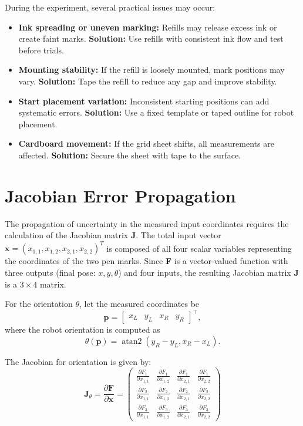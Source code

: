 During the experiment, several practical issues may occur:

\begin{itemize}
    \item \textbf{Ink spreading or uneven marking:} Refills may release excess ink or create faint marks.  
    \textbf{Solution:} Use refills with consistent ink flow and test before trials.

    \item \textbf{Mounting stability:} If the refill is loosely mounted, mark positions may vary.  
    \textbf{Solution:} Tape the refill to reduce any gap and improve stability.

    \item \textbf{Start placement variation:} Inconsistent starting positions can add systematic errors.  
    \textbf{Solution:} Use a fixed template or taped outline for robot placement.

    \item \textbf{Cardboard movement:} If the grid sheet shifts, all measurements are affected.  
    \textbf{Solution:} Secure the sheet with tape to the surface.
\end{itemize}

\section{Jacobian Error Propagation}

The propagation of uncertainty in the measured input coordinates requires the calculation of the Jacobian matrix \textbf{J}. The total input vector $\mathbf{x} = (x_{1,1}, x_{1,2}, x_{2,1}, x_{2,2})^T$ is composed of all four scalar variables representing the coordinates of the two pen marks. Since \textbf{F} is a vector-valued function with three outputs (final pose: $x, y, \theta$) and four inputs, the resulting Jacobian matrix \textbf{J} is a $3 \times 4$ matrix.

For the orientation $\theta$, let the measured coordinates be
\[
\mathbf{p} = \begin{bmatrix} x_L & y_L & x_R & y_R \end{bmatrix}^\top,
\]
where the robot orientation is computed as
\[
\theta(\mathbf{p}) = \operatorname{atan2}(y_R - y_L, x_R - x_L).
\]

The Jacobian for orientation is given by:
\[
\mathbf{J}_\theta = \frac{\partial \mathbf{F}}{\partial \mathbf{x}} = 
\begin{pmatrix}
\frac{\partial F_1}{\partial x_{1,1}} & \frac{\partial F_1}{\partial x_{1,2}} & \frac{\partial F_1}{\partial x_{2,1}} & \frac{\partial F_1}{\partial x_{2,2}} \\
\frac{\partial F_2}{\partial x_{1,1}} & \frac{\partial F_2}{\partial x_{1,2}} & \frac{\partial F_2}{\partial x_{2,1}} & \frac{\partial F_2}{\partial x_{2,2}} \\
\frac{\partial F_3}{\partial x_{1,1}} & \frac{\partial F_3}{\partial x_{1,2}} & \frac{\partial F_3}{\partial x_{2,1}} & \frac{\partial F_3}{\partial x_{2,2}}
\end{pmatrix}
\]

